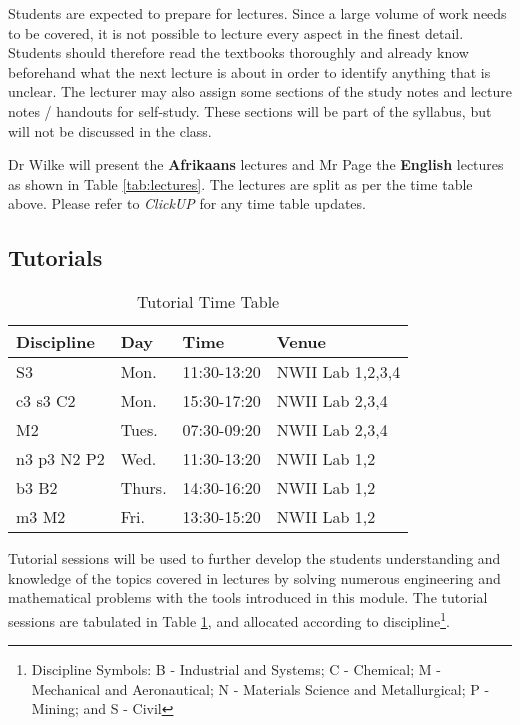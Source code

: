         Students are expected to prepare for lectures. Since a large volume of work
        needs to be covered, it is not possible to lecture every aspect in the
        finest detail. Students should therefore read the textbooks thoroughly
        and already know beforehand what the next lecture is about in order to
        identify anything that is unclear. The lecturer may also assign some
        sections of the study notes and lecture notes / handouts for self-study.
        These sections will be part of the syllabus, but will not be discussed
        in the class.

        Dr Wilke will present the \textbf{Afrikaans} lectures and Mr
        Page the \textbf{English} lectures as shown in Table
        \ref{tab:lectures}. The lectures are split as per the time
        table above. Please refer to {\it ClickUP} for any time table
        updates.

    \subsection{Tutorials}
        \begin{table}[!h]
            \begin{center}
            \begin{tabular}{|l|l|l|l|}
                \hline
                {\bf Discipline} & {\bf Day} & {\bf Time} & {\bf Venue} \\
                \hline
                S3          & Mon.   & 11:30-13:20 & NWII Lab 1,2,3,4 \\
                c3 s3 C2    & Mon.   & 15:30-17:20 & NWII Lab 2,3,4 \\
                M2          & Tues.  & 07:30-09:20 & NWII Lab 2,3,4 \\
                n3 p3 N2 P2 & Wed.   & 11:30-13:20 & NWII Lab 1,2 \\
                b3 B2       & Thurs. & 14:30-16:20 & NWII Lab 1,2 \\
                m3 M2       & Fri.   & 13:30-15:20 & NWII Lab 1,2 \\
                \hline
            \end{tabular}
            \caption{Tutorial Time Table}
            \label{tab:tutorials}
            \end{center}
        \end{table}

        Tutorial sessions will be used to further develop the students
        understanding and knowledge of the topics covered in lectures
        by solving numerous engineering and mathematical problems with
        the tools introduced in this module. The tutorial sessions are
        tabulated in Table \ref{tab:tutorials}, and allocated
        according to discipline\footnote{Discipline Symbols:
            B - Industrial and Systems;
            C - Chemical; M - Mechanical and Aeronautical;
            N - Materials Science and Metallurgical;
            P - Mining; and S - Civil}.

